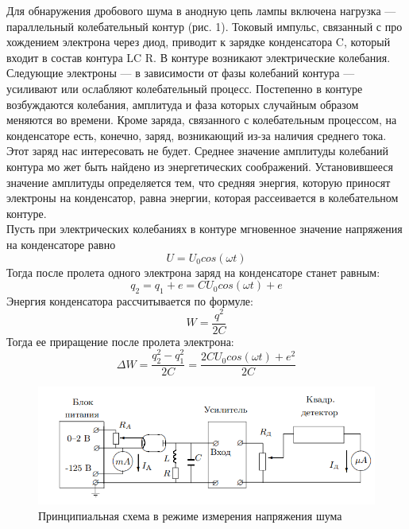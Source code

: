 \documentclass[a4paper, 12pt]{article}%
\begin{document}
	 Для обнаружения дробового шума в анодную
	 цепь лампы включена нагрузка
	 — параллельный
	 колебательный
	 контур (рис. 1).
	 Токовый импульс, связанный с про
	 хождением электрона через диод, приводит
	 к зарядке конденсатора
	 C, который
	 входит в состав
	 контура LC
	 R. В
	 контуре возникают электрические
	 колебания. Следующие электроны
	 — в зависимости от фазы
	 колебаний
	 контура
	 —
	 усиливают или ослабляют
	 колебательный процесс. Постепенно
	 в контуре возбуждаются
	 колебания, амплитуда
	 и фаза
	 которых случайным образом меняются во времени. Кроме заряда, связанного с колебательным процессом, на
	 конденсаторе есть,
	 конечно, заряд, возникающий из-за наличия среднего тока. Этот заряд нас интересовать не будет.
	 Среднее значение амплитуды
	 колебаний
	 контура мо
	 жет быть найдено из
	 энергетических соображений.
	 Установившееся значение амплитуды определяется тем, что средняя энергия,
	 которую приносят электроны на
	 конденсатор, равна энергии,
	 которая рассеивается в колебательном
	 контуре.\\
	 Пусть при электрических
	 колебаниях в контуре мгновенное значение
	 напряжения на
	 конденсаторе равно
	 \begin{equation}
	 	U = U_0cos(\omega t)
	 \end{equation}
 	Тогда после пролета одного электрона заряд на конденсаторе станет равным:
 	\begin{equation}
 		q_2=q_1+e=CU_0cos(\omega t) + e
 	\end{equation}
 	Энергия конденсатора рассчитывается по формуле:
 	\begin{equation}
 		W = \frac{q^2}{2C}
 	\end{equation}
 	Тогда ее приращение после пролета электрона:
 	\begin{equation}
 		\Delta W = \frac{q_2^2 - q_1^2}{2C} = \frac{2CU_0cos(\omega t) + e^2}{2C}
 	\end{equation}
 	\begin{figure}[H]
 		\centering
 		\includegraphics[width=0.9\linewidth]{шум}
 		\caption{Принципиальная схема в режиме измерения напряжения шума}
 		\label{fig:}
 	\end{figure}
\end{document}
